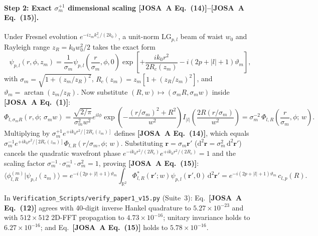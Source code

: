 \documentclass[10pt,letterpaper]{article}
\newcommand{\braket}[2]{\langle #1 | #2 \rangle}
\newcommand{\abs}[1]{\lvert #1 \rvert}
\newcommand{\dd}{\mathrm{d}}
\newcommand{\josa}[1]{\textbf{[JOSA~A Eq.~(#1)]}}
\numberwithin{equation}{section}
\begin{document}
\paragraph*{Step 2: Exact $\sigma_m^{+1}$ dimensional scaling \josa{14}--\josa{15}.}
Under Fresnel evolution $e^{-iz_m k_\perp^2/(2k_0)}$, a unit-norm $\mathrm{LG}_{p,l}$ beam of waist $w_0$ and Rayleigh range $z_R = k_0 w_0^2/2$ takes the exact form
\begin{equation}
  \psi_{p,l}(r,\phi,z_m) = \frac{1}{\sigma_m}\psi_{p,l}\!\left(\frac{r}{\sigma_m},\phi,0\right)\exp\!\left[+\frac{ik_0 r^2}{2 R_c(z_m)} - i(2p+\abs{l}+1)\vartheta_m\right],
\end{equation}
with $\sigma_m = \sqrt{1+(z_m/z_R)^2}$, $R_c(z_m) = z_m[1+(z_R/z_m)^2]$, and $\vartheta_m = \arctan(z_m/z_R)$. Now substitute $(R,w) \mapsto (\sigma_m R, \sigma_m w)$ inside \josa{1}:
\begin{equation}
  \Phi_{l,\sigma_m R}(r,\phi;\,\sigma_m w) = \frac{\sqrt{2/\pi}}{\sigma_m^2 w^2} e^{il\phi}\exp\!\left(-\frac{(r/\sigma_m)^2 + R^2}{w^2}\right) I_{\abs{l}}\!\left(\frac{2R(r/\sigma_m)}{w^2}\right) = \sigma_m^{-2}\,\Phi_{l,R}\!\left(\frac{r}{\sigma_m},\phi;\,w\right).
\end{equation}
Multiplying by $\sigma_m^{+1} e^{+ik_0 r^2/[2R_c(z_m)]}$ defines \josa{14}, which equals $\sigma_m^{-1} e^{+ik_0 r^2/[2R_c(z_m)]}\Phi_{l,R}(r/\sigma_m,\phi;\,w)$. Substituting $\mathbf{r} = \sigma_m\mathbf{r}'$ ($\dd^2\mathbf{r} = \sigma_m^2\,\dd^2\mathbf{r}'$) cancels the quadratic wavefront phase $e^{-ik_0 r^2/(2R_c)} e^{+ik_0 r^2/(2R_c)} = 1$ and the scaling factor $\sigma_m^{-1}\cdot\sigma_m^{-1}\cdot\sigma_m^2 = 1$, proving \josa{15}:
\begin{equation}
  \braket{\phi_{l,R}^{(m)}}{\psi_{p,l}(z_m)} = e^{-i(2p+\abs{l}+1)\vartheta_m}\int_{\mathbb{R}^2}\Phi_{l,R}^*(\mathbf{r}';w)\psi_{p,l}(\mathbf{r}',0)\,\dd^2\mathbf{r}' = e^{-i(2p+\abs{l}+1)\vartheta_m}\,c_{l,p}(R).
\end{equation}

\begin{auditbox}
In \texttt{Verification\_Scripts/verify\_paper1\_v15.py} (Suite~3): Eq.~\josa{12} agrees with 40-digit inverse Hankel quadrature to $5.27\times 10^{-23}$ and with $512\times 512$ 2D-FFT propagation to $4.73\times 10^{-16}$; unitary invariance holds to $6.27\times 10^{-16}$; and Eq.~\josa{15} holds to $5.78\times 10^{-16}$.
\end{auditbox}
\end{document}
